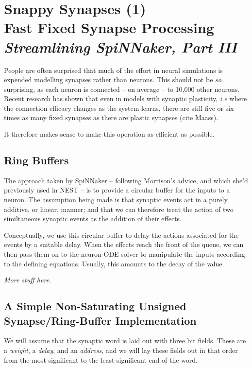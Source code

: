 \chapter[Snappy Synapses (2)]{Snappy Synapses (1)\\
Fast Fixed Synapse Processing\\
{\it Streamlining SpiNNaker, Part III}}


People are often surprised that much of the effort in neural
simulations is expended modelling synapses rather than neurons. This
should not be {\em so} surprising, as each neuron is connected -- on
average -- to 10,000 other neurons. Recent research has shown that
even in models with synaptic plasticity, {\it i.e} where the
connection efficacy changes as the system learns, there are still five
or six times as many fixed synapses as there are plastic synapses
(cite Maass).

It therefore makes sense to make this operation as efficient as possible.

\section{Ring Buffers}

The approach taken by SpiNNaker -- following Morrison's advice, and
which she'd previously used in NEST -- is to provide a circular buffer
for the inputs to a neuron. The assumption being made is that synaptic
events act in a purely additive, or linear, manner; and that we can
therefore treat the action of two similtaneous synaptic events as the
addition of their effects.

Conceptually, we use this circular buffer to delay the actions
associated for the events by a suitable delay. When the effects reach
the front of the queue, we can then pass them on to the neuron ODE
solver to manipulate the inputs according to the defining
equations. Usually, this amounts to the decay of the value.

{\em More stuff here.}

\section{A Simple Non-Saturating Unsigned Synapse/Ring-Buffer Implementation}

We will assume that the synaptic word is laid out with three bit
fields. These are a {\em weight}, a {\em delay}, and an {\em address},
and we will lay these fields out in that order from the
most-significant to the least-significant end of the word.

